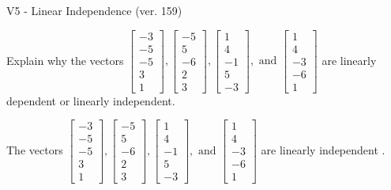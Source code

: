 \begin{exercise}
  \begin{exerciseTitle}V5 - Linear Independence (ver. 159)\end{exerciseTitle}
  \begin{exerciseStatement}
    Explain why the vectors \(\left[\begin{array}{r}
-3 \\
-5 \\
-5 \\
3 \\
1
\end{array}\right] , \left[\begin{array}{r}
-5 \\
5 \\
-6 \\
2 \\
3
\end{array}\right] , \left[\begin{array}{r}
1 \\
4 \\
-1 \\
5 \\
-3
\end{array}\right] , \text{ and } \left[\begin{array}{r}
1 \\
4 \\
-3 \\
-6 \\
1
\end{array}\right]\) are linearly dependent or linearly independent.	


  \end{exerciseStatement}
  \begin{exerciseAnswer}
   The vectors \(\left[\begin{array}{r}
-3 \\
-5 \\
-5 \\
3 \\
1
\end{array}\right] , \left[\begin{array}{r}
-5 \\
5 \\
-6 \\
2 \\
3
\end{array}\right] , \left[\begin{array}{r}
1 \\
4 \\
-1 \\
5 \\
-3
\end{array}\right] , \text{ and } \left[\begin{array}{r}
1 \\
4 \\
-3 \\
-6 \\
1
\end{array}\right]\) are 
  	 linearly independent  .
  


  \end{exerciseAnswer}
\end{exercise}